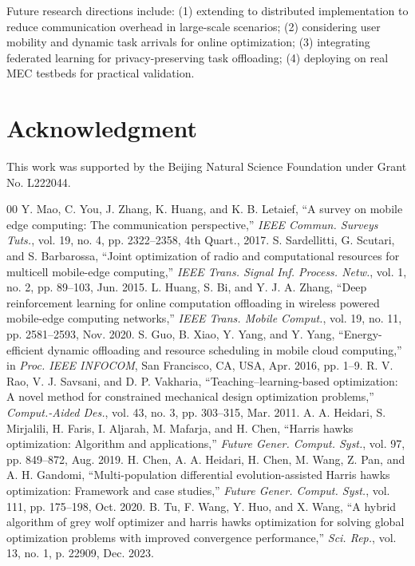 \documentclass[conference]{IEEEtran}
\begin{document}
Future research directions include: (1) extending to distributed implementation to reduce communication overhead in large-scale scenarios; (2) considering user mobility and dynamic task arrivals for online optimization; (3) integrating federated learning for privacy-preserving task offloading; (4) deploying on real MEC testbeds for practical validation.

\section*{Acknowledgment}

This work was supported by the Beijing Natural Science Foundation under Grant No. L222044.

\begin{thebibliography}{00}
 Y. Mao, C. You, J. Zhang, K. Huang, and K. B. Letaief, ``A survey on mobile edge computing: The communication perspective,'' \textit{IEEE Commun. Surveys Tuts.}, vol. 19, no. 4, pp. 2322--2358, 4th Quart., 2017.
 S. Sardellitti, G. Scutari, and S. Barbarossa, ``Joint optimization of radio and computational resources for multicell mobile-edge computing,'' \textit{IEEE Trans. Signal Inf. Process. Netw.}, vol. 1, no. 2, pp. 89--103, Jun. 2015.
 L. Huang, S. Bi, and Y. J. A. Zhang, ``Deep reinforcement learning for online computation offloading in wireless powered mobile-edge computing networks,'' \textit{IEEE Trans. Mobile Comput.}, vol. 19, no. 11, pp. 2581--2593, Nov. 2020.
 S. Guo, B. Xiao, Y. Yang, and Y. Yang, ``Energy-efficient dynamic offloading and resource scheduling in mobile cloud computing,'' in \textit{Proc. IEEE INFOCOM}, San Francisco, CA, USA, Apr. 2016, pp. 1--9.
 R. V. Rao, V. J. Savsani, and D. P. Vakharia, ``Teaching--learning-based optimization: A novel method for constrained mechanical design optimization problems,'' \textit{Comput.-Aided Des.}, vol. 43, no. 3, pp. 303--315, Mar. 2011.
 A. A. Heidari, S. Mirjalili, H. Faris, I. Aljarah, M. Mafarja, and H. Chen, ``Harris hawks optimization: Algorithm and applications,'' \textit{Future Gener. Comput. Syst.}, vol. 97, pp. 849--872, Aug. 2019.
 H. Chen, A. A. Heidari, H. Chen, M. Wang, Z. Pan, and A. H. Gandomi, ``Multi-population differential evolution-assisted Harris hawks optimization: Framework and case studies,'' \textit{Future Gener. Comput. Syst.}, vol. 111, pp. 175--198, Oct. 2020.
 B. Tu, F. Wang, Y. Huo, and X. Wang, ``A hybrid algorithm of grey wolf optimizer and harris hawks optimization for solving global optimization problems with improved convergence performance,'' \textit{Sci. Rep.}, vol. 13, no. 1, p. 22909, Dec. 2023.

\end{thebibliography}
\end{document}
